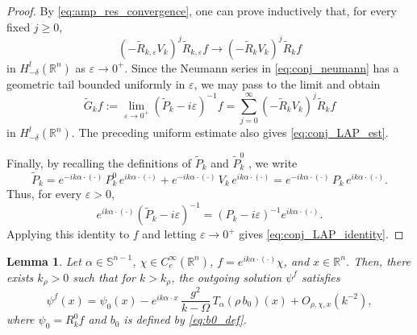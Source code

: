 \documentclass[12pt,a4paper]{amsart}
\numberwithin{equation}{section}
\theoremstyle{plain}
\newtheorem{lemma}[theorem]{Lemma}
\theoremstyle{definition}
\begin{document}
\begin{proof}
By \eqref{eq:amp_res_convergence}, one can prove
inductively that, for every fixed $j\geq0$,
\begin{equation*}
    (-\widetilde R_{k,\varepsilon}V_k)^j
    \widetilde R_{k,\varepsilon}f
    \longrightarrow
    (-\widetilde R_kV_k)^j\widetilde R_kf
\end{equation*}
in $H^l_{-\delta}(\mathbb R^n)$ as $\varepsilon\rightarrow 0^+$.
Since the Neumann series in \eqref{eq:conj_neumann} has a geometric tail
bounded uniformly in $\varepsilon$, we may pass to the limit and obtain
\[
\widetilde G_k f
:=
\lim_{\varepsilon\to0^+}
(\widetilde P_k-i\varepsilon)^{-1}f
=
\sum_{j=0}^\infty
(-\widetilde R_kV_k)^j\widetilde R_kf
\]
in $H^l_{-\delta}(\mathbb R^n)$. The preceding uniform estimate also gives \eqref{eq:conj_LAP_est}.

Finally, by recalling the definitions of $\widetilde{P}_k$ and $\widetilde{P}^0_k$ , we write
\begin{equation*}
    \widetilde{P}_k = e^{-ik\alpha\cdot (\cdot)}\,P^0_k\, e^{ik\alpha\cdot(\cdot)} + e^{-ik\alpha\cdot (\cdot)}\,V_k\, e^{ik\alpha\cdot(\cdot)} = e^{-ik\alpha\cdot (\cdot)}\,P_k\, e^{ik\alpha\cdot(\cdot)}.
\end{equation*}
Thus, for every $\varepsilon>0$,
\[
e^{ik\alpha\cdot(\cdot)}
(\widetilde P_k-i\varepsilon)^{-1}
=
(P_k-i\varepsilon)^{-1}e^{ik\alpha\cdot(\cdot)}.
\]
Applying this identity to $f$ and letting $\varepsilon\to0^+$ gives \eqref{eq:conj_LAP_identity}.
\end{proof}



\begin{lemma}\label{lem:Born_GO}
    Let $\alpha\in\mathbb{S}^{n-1}$, $\chi\in C_c^\infty(\mathbb{R}^n)$, $f=e^{ik\alpha\cdot(\cdot)}\chi$, and $x\in \mathbb{R}^n$. Then, there exists $k_{\rho}>0$ such that for $k>k_{\rho}$, the outgoing solution
    $\psi^{f}$ satisfies
    \begin{equation}\label{eq:Born_GO}
        \psi^{f}(x)
        =  \psi_0(x) - e^{ik\alpha\cdot x}\,
        \frac{g^2}{k - \Omega}\, T_\alpha(\rho\, b_0)(x)
        + O_{\rho,\chi,x}(k^{-2}),
    \end{equation}
    where $\psi_0 = R_k^0 f$ and
    $b_0$ is defined by \eqref{eq:b0_def}.
\end{lemma}
\end{document}

